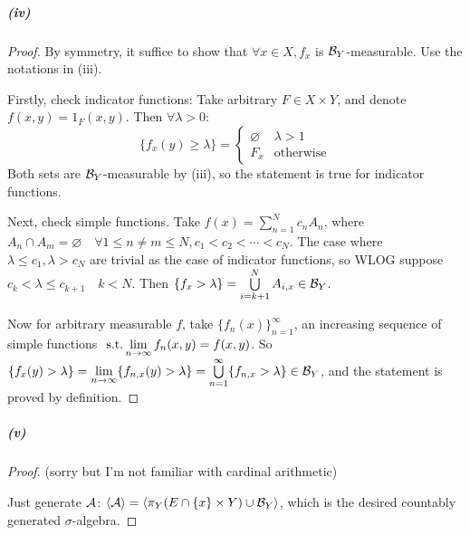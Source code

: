 \documentclass{article}
\begin{document}
\subparagraph{(iv)}
\begin{proof}
By symmetry, it suffice to show that $\forall x\in X, f_x$ is $\mathcal{B}_Y$-measurable. Use the notations in (iii).

Firstly, check indicator functions: Take arbitrary $F\in X\times Y$, and denote $f(x,y)=1_F(x,y)$. Then $\forall\lambda>0$:
\[\{f_x(y)\geq \lambda\}=\begin{cases}\varnothing &\lambda>1\\ F_x&\text{otherwise}\end{cases}\]
Both sets are $\mathcal{B}_Y$-measurable by (iii), so the statement is true for indicator functions.

Next, check simple functions. Take $f(x)=\sum\limits_{n=1}^N c_nA_n$, where $A_n\cap A_m=\varnothing\quad \forall 1\leq n\neq m\leq N, c_1<c_2<\cdots<c_N$. The case where $\lambda\leq c_1,\lambda>c_N$ are trivial as the case of indicator functions, so WLOG suppose $c_k<\lambda\leq c_{k+1}\quad k<N$. Then $\{f_x>\lambda\}=\bigcup\limits_{i=k+1}^N A_{i,x}\in \mathcal{B}_Y$.

Now for arbitrary measurable $f$, take $\{f_n(x)\}_{n=1}^{\infty}$, an increasing sequence of simple functions $\text{ s.t.} \lim\limits_{n\to\infty}f_n(x,y)=f(x,y)$. So $\{f_x(y)>\lambda\}=\lim\limits_{n\to\infty}\{f_{n,x}(y)>\lambda\}=\bigcup\limits_{n=1}^{\infty}\{f_{n,x}>\lambda\}\in\mathcal{B}_Y$, and the statement is proved by definition.
\end{proof}
\subparagraph{(v)}
\begin{proof}
(sorry but I'm not familiar with cardinal arithmetic)

Just generate $\mathcal{A}$: $\left<\mathcal{A}\right>=\left<\pi_Y(E\cap \{x\}\times Y)\cup \mathcal{B}_Y\right>$, which is the desired countably generated $\sigma$-algebra.

\end{proof}
\end{document}
